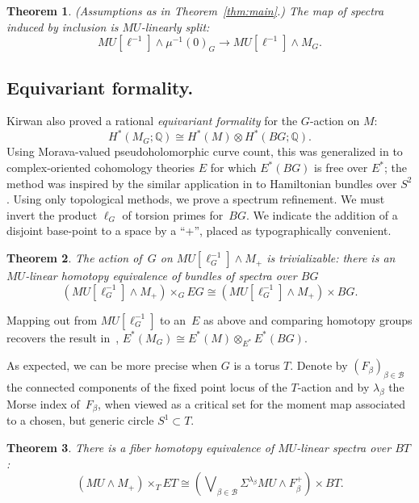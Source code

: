 \documentclass[11pt, reqno]{amsart}
\theoremstyle{plain}
\newtheorem{thm}{Theorem}[section]
\theoremstyle{definition}
\begin{document}
\begin{thm} \label{thm:specKirwan}
(Assumptions as in Theorem~\ref{thm:main}.) The map of spectra induced by inclusion is $MU$-linearly split: 
\[
MU [\ell^{-1}]\wedge \mu^{-1}(0)_G \to MU[\ell^{-1}]\wedge M_G.
\] 
\end{thm}
\subsection{Equivariant formality.}
Kirwan also proved \cite[Proposition~5.8]{Kirwan} a rational \emph{equivariant formality}  
for the $G$-action on $M$:
\begin{equation}\label{eq:factorKirwan}
H^*\left(M_G;\mathbb{Q}\right) \cong H^*(M)\otimes H^*(BG;\mathbb{Q}). 
\end{equation}
Using Morava-valued  pseudoholomorphic curve count, this was generalized in \cite{BaiPomerleano} 
to complex-oriented cohomology theories $E$ for which $E^*(BG)$ is free over $E^*$; the method was inspired 
by the similar application in \cite{AMS} to Hamiltonian bundles over $S^2$. Using only  topological 
methods, we prove a spectrum refinement. We must invert the product $\ell_G$ of torsion 
primes for~$BG$. We  indicate the addition of a disjoint base-point to a space by a ``+'', 
placed as typographically convenient. 

\begin{thm}\label{thm:specformal}
The action of~$G$ on $MU[\ell_G^{-1}]\wedge M_+$ is trivializable: there is an $MU$-linear homotopy 
equivalence of bundles of spectra over $BG$
\[
\left(MU[\ell_G^{-1}]\wedge M_+\right)\times_G EG \cong \left(MU [\ell_G^{-1}]\wedge M_+\right) \times BG.
\]
\end{thm}
\noindent
Mapping out from $MU[\ell_G^{-1}]$ to an~$E$ as above and comparing homotopy groups recovers the 
result in~\cite{BaiPomerleano},  $E^*(M_G) \cong E^*(M)\otimes_{E^*} E^*(BG)$. 


As expected, we can be more precise when $G$ is a torus $T$. Denote by $(F_\beta)_{\beta \in \mathcal{B}} $  
the connected components of the fixed point locus of the $T$-action and by $\lambda_\beta$ the 
Morse index of~$F_\beta$, when viewed as a critical set for the moment map associated 
to a chosen, but generic circle $S^1 \subset T$.  

\begin{thm} \label{thm:spectorus}   
There is a fiber homotopy equivalence of $MU$-linear spectra over $BT$:
\[
\left(MU\wedge M_+\right)\times_T ET \cong 
\left(\bigvee\nolimits_{\beta \in \mathcal{B}} \Sigma^{\lambda_\beta} MU\wedge F_\beta^+\right) \times BT.
\]
\end{thm}
\end{document}

